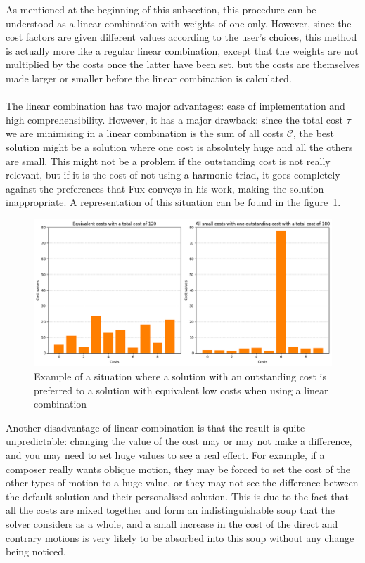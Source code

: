As mentioned at the beginning of this subsection, this procedure can be understood as a linear combination with weights of one only. However, since the cost factors are given different values according to the user's choices, this method is actually more like a regular linear combination, except that the weights are not multiplied by the costs once the latter have been set, but the costs are themselves made larger or smaller before the linear combination is calculated.

\paragraph{}
The linear combination has two major advantages: ease of implementation and high comprehensibility.
However, it has a major drawback: since the total cost $\tau$ we are minimising in a linear combination is the sum of all costs $\mathcal{C}$, the best solution might be a solution where one cost is absolutely huge and all the others are small. This might not be a problem if the outstanding cost is not really relevant, but if it is the cost of not using a harmonic triad, it goes completely against the preferences that Fux conveys in his work, making the solution inappropriate. A representation of this situation can be found in the figure~\ref{fig:outstanding-cost}.

\begin{figure}[h!]
    \centering
    \includegraphics[width=1\textwidth]{Images/outstanding-costs.png}
    \caption{Example of a situation where a solution with an outstanding cost is preferred to a solution with equivalent low costs when using a linear combination}
    \label{fig:outstanding-cost}
\end{figure}

Another disadvantage of linear combination is that the result is quite unpredictable: changing the value of the cost may or may not make a difference, and you may need to set huge values to see a real effect. For example, if a composer really wants oblique motion, they may be forced to set the cost of the other types of motion to a huge value, or they may not see the difference between the default solution and their personalised solution. This is due to the fact that all the costs are mixed together and form an indistinguishable soup that the solver considers as a whole, and a small increase in the cost of the direct and contrary motions is very likely to be absorbed into this soup without any change being noticed.


